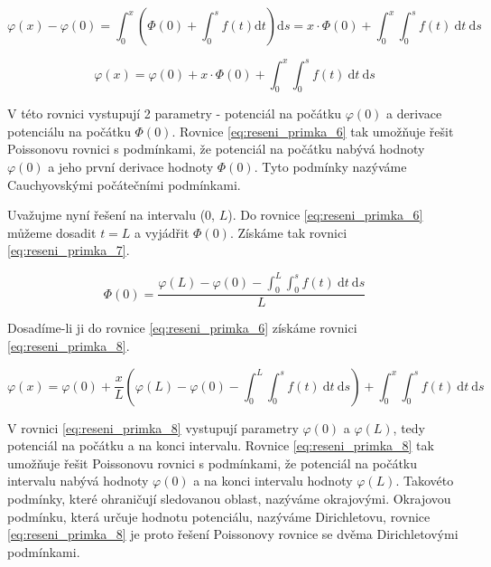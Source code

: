 \documentclass{book}
\begin{document}
\begin{equation}
\label{eq:reseni_primka_5}
\varphi(x) - \varphi(0) = \int_0^x \left( \Phi(0) + \int_0^s f(t) \mathrm{d}t \right) \mathrm{d}s = x \cdot \Phi(0) + \int_0^x \int_0^s f(t) \ \mathrm{d}t \ \mathrm{d}s
\end{equation}

\begin{equation}
\label{eq:reseni_primka_6}
\varphi(x) = \varphi(0) + x \cdot \Phi(0) + \int_0^x \int_0^s f(t) \ \mathrm{d}t \ \mathrm{d}s
\end{equation}

V této rovnici vystupují 2 parametry - potenciál na počátku \(\varphi(0)\) a derivace potenciálu na počátku \(\Phi(0)\). Rovnice \eqref{eq:reseni_primka_6} tak umožňuje
řešit Poissonovu rovnici s podmínkami, že potenciál na počátku nabývá hodnoty \(\varphi(0)\) a jeho první derivace hodnoty \(\Phi(0)\). Tyto podmínky nazýváme Cauchyovskými počátečními podmínkami.

Uvažujme nyní řešení na intervalu (0, \(L\)). Do rovnice \eqref{eq:reseni_primka_6} můžeme dosadit \(t = L\) a vyjádřit \(\Phi(0)\).
Získáme tak rovnici \eqref{eq:reseni_primka_7}.

\begin{equation}
\label{eq:reseni_primka_7}
\Phi(0) = \frac{\varphi(L) - \varphi(0) - \int_0^L \int_0^s f(t) \ \mathrm{d}t \ \mathrm{d}s}{L}
\end{equation}

Dosadíme-li ji do rovnice \eqref{eq:reseni_primka_6} získáme rovnici \eqref{eq:reseni_primka_8}.

\begin{equation}
\label{eq:reseni_primka_8}
\varphi(x) = \varphi(0) + \frac{x}{L} \left( \varphi(L) - \varphi(0) - \int_0^L \int_0^s f(t) \ \mathrm{d}t \ \mathrm{d}s \right) + \int_0^x \int_0^s f(t) \ \mathrm{d}t \ \mathrm{d}s
\end{equation}

V rovnici \eqref{eq:reseni_primka_8} vystupují parametry \(\varphi(0)\) a \(\varphi(L)\), tedy potenciál na počátku a na konci intervalu. Rovnice \eqref{eq:reseni_primka_8} tak umožňuje
řešit Poissonovu rovnici s podmínkami, že potenciál na počátku intervalu nabývá hodnoty \(\varphi(0)\) a na konci intervalu hodnoty \(\varphi(L)\). Takovéto podmínky, které ohraničují sledovanou oblast, nazýváme okrajovými.
Okrajovou podmínku, která určuje hodnotu potenciálu, nazýváme Dirichletovu, rovnice \eqref{eq:reseni_primka_8} je proto řešení Poissonovy rovnice se dvěma Dirichletovými podmínkami.
\end{document}
